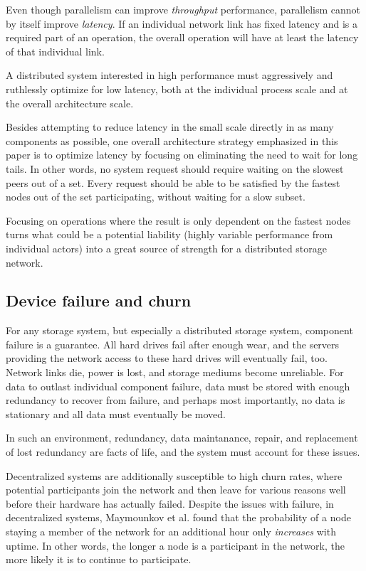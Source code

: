 \documentclass[a4paper,10pt]{article}
\begin{document}
Even though parallelism can improve {\em throughput} performance, parallelism
cannot by itself improve {\em latency}. If an individual network link has fixed
latency and is a required part of an operation, the overall operation will
have at least the latency of that individual link.

A distributed system interested in high performance must aggressively and
ruthlessly optimize for low latency, both at the individual process scale and
at the overall architecture scale.

Besides attempting to reduce latency in the small scale directly in as many
components as possible, one overall architecture strategy emphasized in this
paper is to optimize latency by focusing on eliminating the need to wait for
long tails.\cite{tail-at-scale} In other words, no system request should require
waiting on the slowest peers out of a set. Every request should be able to be
satisfied by the fastest nodes out of the set participating, without waiting
for a slow subset.

Focusing on operations where the result is only dependent on the fastest nodes
turns what could be a potential liability (highly variable performance from
individual actors) into a great source of strength for a distributed storage
network.

\subsection{Device failure and churn}

For any storage system, but especially a distributed storage system, component
failure is a guarantee. All hard drives fail
after enough wear\cite{backblaze-hd-2018-q1}, and the servers providing
the network access to these hard drives will eventually fail, too. Network
links die, power is lost, and storage mediums become unreliable. For data
to outlast individual component failure, data must be stored with enough
redundancy to recover from failure, and perhaps most importantly, no data is
stationary and all data must eventually be moved.

In such an environment, redundancy, data maintanance, repair, and replacement
of lost redundancy are facts of life, and the system must account for these
issues.

Decentralized systems are additionally susceptible to high churn rates,
where potential participants join the network and then leave for various
reasons well before their hardware has actually failed. Despite the issues with
failure, in decentralized systems, Maymounkov et al. found that
the probability of a node staying a member of the network for an additional
hour only {\em increases} with uptime.\cite{kademlia} In other words, the
longer a node is a participant in the network, the more likely it is to
continue to participate.
\end{document}
